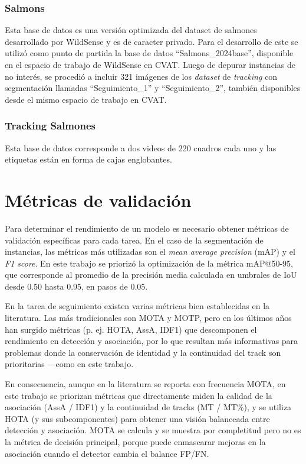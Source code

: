 \subsubsection{Salmons}
Esta base de datos es una versión optimizada del dataset de salmones desarrollado por WildSense y es de caracter privado. Para el desarrollo de este se utilizó como punto de partida la base de datos ``Salmons_2024base'', disponible en el espacio de trabajo de WildSense en CVAT. Luego de depurar instancias de no interés, se procedió a incluir 321 imágenes de los \textit{dataset} de \textit{tracking} con segmentación llamadas ``Seguimiento_1'' y ``Seguimiento_2'', también disponibles desde el mismo espacio de trabajo en CVAT.

\subsubsection{Tracking Salmones}
Esta base de datos corresponde a dos videos de 220 cuadros cada uno y las etiquetas están en forma de cajas englobantes.

\section{Métricas de validación}
Para determinar el rendimiento de un modelo es necesario obtener métricas de validación específicas para cada tarea. En el caso de la segmentación de instancias, las métricas más utilizadas son el \textit{mean average precision} (mAP) y el \textit{F1 score}. En este trabajo se priorizó la optimización de la métrica mAP@50-95, que corresponde al promedio de la precisión media calculada en umbrales de IoU desde 0.50 hasta 0.95, en pasos de 0.05.

 En la tarea de seguimiento existen varias métricas bien establecidas en la literatura. Las más tradicionales son MOTA y MOTP, pero en los últimos años han surgido métricas (p. ej. HOTA, AssA, IDF1) que descomponen el rendimiento en detección y asociación, por lo que resultan más informativas para problemas donde la conservación de identidad y la continuidad del track son prioritarias ---como en este trabajo.

 En consecuencia, aunque en la literatura se reporta con frecuencia MOTA, en este trabajo se priorizan métricas que directamente miden la calidad de la asociación (AssA / IDF1) y la continuidad de tracks (MT / MT\%), y se utiliza HOTA (y sus subcomponentes) para obtener una visión balanceada entre detección y asociación. MOTA se calcula y se muestra por completitud pero no es la métrica de decisión principal, porque puede enmascarar mejoras en la asociación cuando el detector cambia el balance FP/FN.

